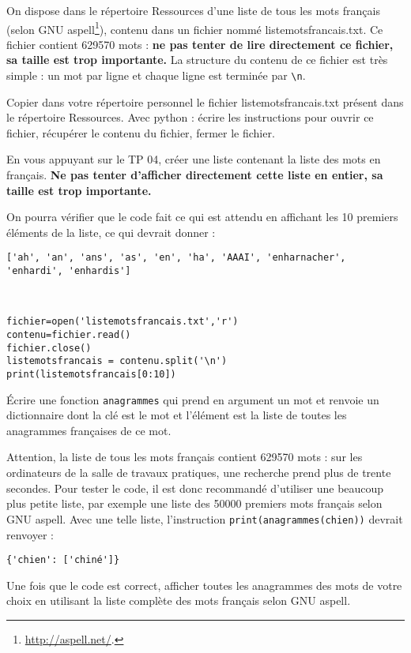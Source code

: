 \begin{exercice}
On dispose dans le répertoire Ressources d'une liste de tous les mots français (selon GNU aspell\footnote{\url{http://aspell.net/}.}), contenu dans un fichier nommé listemotsfrancais.txt. Ce fichier contient \num{629570} mots : \textbf{ne pas tenter de lire directement ce fichier, sa taille est trop importante.} La structure du contenu de ce fichier est très simple : un mot par ligne et chaque ligne est terminée par \verb?\n?.

Copier dans votre répertoire personnel le fichier listemotsfrancais.txt présent dans le répertoire Ressources. Avec python : écrire les instructions pour ouvrir ce fichier, récupérer le contenu du fichier, fermer le fichier.

En vous appuyant sur le TP 04, créer une liste contenant la liste des mots en français. \textbf{Ne pas tenter d'afficher directement cette liste en entier, sa taille est trop importante.}

On pourra vérifier que le code fait ce qui est attendu en affichant les 10 premiers éléments de la liste, ce qui devrait donner :

\verb?['ah', 'an', 'ans', 'as', 'en', 'ha', 'AAAI', 'enharnacher', 'enhardi', 'enhardis']?
\end{exercice}

\begin{solution}~\
\begin{verbatim}
fichier=open('listemotsfrancais.txt','r')
contenu=fichier.read()
fichier.close()
listemotsfrancais = contenu.split('\n')
print(listemotsfrancais[0:10])
\end{verbatim}
\end{solution}

\begin{exercice}
Écrire une fonction \verb?anagrammes? qui prend en argument un mot et renvoie un dictionnaire dont la clé est le mot et l'élément est la liste de toutes les anagrammes françaises de ce mot.

Attention, la liste de tous les mots français contient \num{629570} mots : sur les ordinateurs de la salle de travaux pratiques, une recherche prend plus de trente secondes. Pour tester le code, il est donc recommandé d'utiliser une beaucoup plus petite liste, par exemple une liste des \num{50000} premiers mots français selon GNU aspell. Avec une telle liste, l'instruction \verb?print(anagrammes(chien))? devrait renvoyer :

\verb?{'chien': ['chiné']}?

Une fois que le code est correct, afficher toutes les anagrammes des mots de votre choix en utilisant la liste complète des mots français selon GNU aspell.
\end{exercice}

